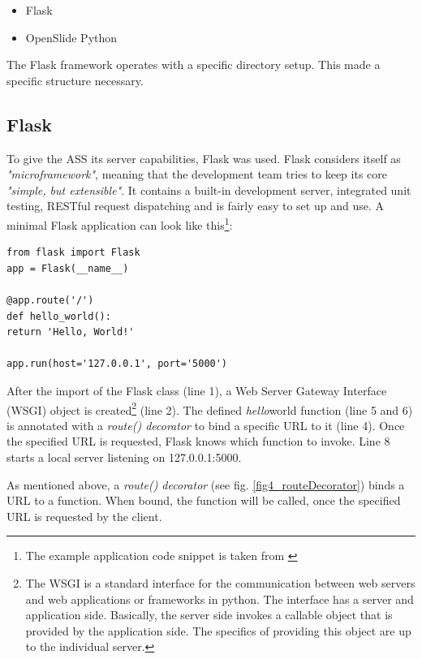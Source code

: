 \begin{itemize}
	\item Flask\cite{web:flask}
	\item OpenSlide Python\cite{web:openslide}
\end{itemize}

The Flask framework operates with a specific directory setup. This made a specific structure necessary. 


\subsection{Flask}
To give the ASS its server capabilities, Flask was used. Flask considers itself as \emph{"microframework"}, meaning that the development team tries to keep its core \emph{"simple, but extensible"}\cite{web:flask}. It contains a built-in development server, integrated unit testing, RESTful request dispatching and is fairly easy to set up and use. A minimal Flask application can look like this\footnote{The example application code snippet is taken from \cite{web:flask}}:

\begin{lstlisting}[frame=single]
from flask import Flask
app = Flask(__name__)

@app.route('/')
def hello_world():
return 'Hello, World!'

app.run(host='127.0.0.1', port='5000')
\end{lstlisting}

After the import of the Flask class (line 1), a Web Server Gateway Interface (WSGI) object is created\footnote{The WSGI is a standard interface for the communication between web servers and web applications or frameworks in python. The interface has a server and application side. Basically, the server side invokes a callable object that is provided by the application side. The specifics of providing this object are up to the individual server\cite{Brandl16}.} (line 2). The defined \emph{hello\textunderscore}world function (line 5 and 6) is annotated with a \emph{route() decorator} to bind a specific URL to it (line 4). Once the specified URL is requested, Flask knows which function to invoke. Line 8 starts a local server listening on 127.0.0.1:5000.

As mentioned above, a \emph{route() decorator} (see fig. \ref{fig4_routeDecorator}) binds a URL to a function. When bound, the function will be called, once the specified URL is requested by the client\cite{web:flask}.

